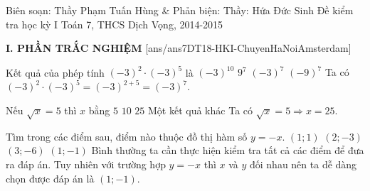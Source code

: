 
	\begin{name}
		{Biên soạn: Thầy Phạm Tuấn Hùng \& Phản biện: Thầy: Hứa Đức Sinh}
		{Đề kiểm tra học kỳ I Toán 7, THCS Dịch Vọng, 2014-2015}
	\end{name}
	\noindent\textbf{I. PHẦN TRẮC NGHIỆM}
	\setcounter{ex}{0}
	[ans/ans7DT18-HKI-ChuyenHaNoiAmsterdam]
		\begin{ex}%
			Kết quả của phép tính $(-3)^2\cdot (-3)^5$ là
			\choice
			{$(-3)^{10}$}
			{$9^7$}
			{\True $(-3)^7$}
			{$(-9)^7$}
			\loigiai
			{
				Ta có $(-3)^2\cdot (-3)^5=(-3)^{2+5}=(-3)^7$.
			}
		\end{ex}
	
		\begin{ex}%
			Nếu $\sqrt{x}=5$ thì $x$ bằng
			\choice
			{$5$}
			{$10$}
			{\True $25$}
			{Một kết quả khác}
			\loigiai
			{
				Ta có $\sqrt{x}=5 \Rightarrow x=25$.
			}
		\end{ex}
	
		\begin{ex}%
				Tìm trong các điểm sau, điểm nào thuộc đồ thị hàm số $y=-x$.
				\choice
				{$(1;1)$}
				{$(2;-3)$}
				{$(3;-6)$}
				{\True $(1;-1)$}
				\loigiai
				{
					Bình thường ta cần thực hiện kiểm tra tất cả các điểm để đưa ra đáp án. Tuy nhiên với trường hợp $y=-x$ thì $x$ và $y$ đối nhau nên ta dễ dàng chọn được đáp án là $(1;-1)$.
				}
			\end{ex}
		
